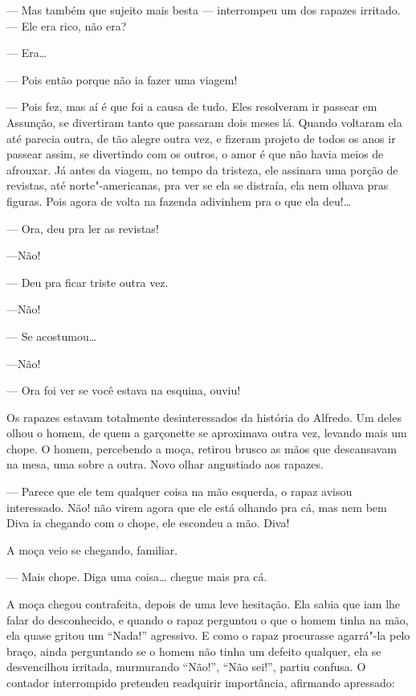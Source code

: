 --- Mas também que sujeito mais besta --- interrompeu um dos rapazes
irritado. --- Ele era rico, não era?

--- Era\ldots{}

--- Pois então porque não ia fazer uma viagem!

--- Pois fez, mas aí é que foi a causa de tudo. Eles resolveram ir
passear em Assunção, se divertiram tanto que passaram dois meses lá.
Quando voltaram ela até parecia outra, de tão alegre outra vez, e
fizeram projeto de todos os anos ir passear assim, se divertindo com os
outros, o amor é que não havia meios de afrouxar. Já antes da viagem, no
tempo da tristeza, ele assinara uma porção de revistas, até
norte"-americanas, pra ver se ela se distraía, ela nem olhava pras
figuras. Pois agora de volta na fazenda adivinhem pra o que ela deu!\ldots{}

--- Ora, deu pra ler as revistas!

---Não!

--- Deu pra ficar triste outra vez.

---Não!

--- Se acostumou\ldots{}

---Não!

--- Ora foi ver se você estava na esquina, ouviu!

Os rapazes estavam totalmente desinteressados da história do Alfredo. Um
deles olhou o homem, de quem a garçonette se aproximava outra vez,
levando mais um chope. O homem, percebendo a moça, retirou brusco as
mãos que descansavam na mesa, uma sobre a outra. Novo olhar angustiado
aos rapazes.

--- Parece que ele tem qualquer coisa na mão esquerda, o rapaz avisou
interessado. Não! não virem agora que ele está olhando pra cá, mas nem
bem Diva ia chegando com o chope, ele escondeu a mão. Diva!

A moça veio se chegando, familiar.

--- Mais chope. Diga uma coisa\ldots{} chegue mais pra cá.

A moça chegou contrafeita, depois de uma leve hesitação. Ela sabia que
iam lhe falar do desconhecido, e quando o rapaz perguntou o que o homem
tinha na mão, ela quase gritou um ``Nada!'' agressivo. E como o rapaz
procurasse agarrá"-la pelo braço, ainda perguntando se o homem não tinha
um defeito qualquer, ela se desvencilhou irritada, murmurando ``Não!'',
``Não sei!'', partiu confusa. O contador interrompido pretendeu
readquirir importância, afirmando apressado:

